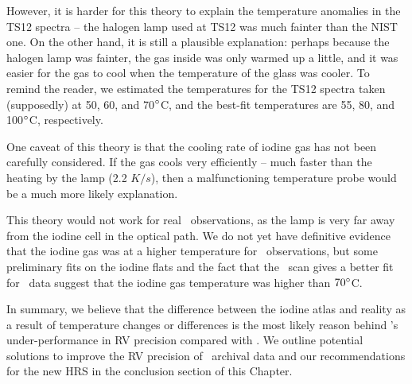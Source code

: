 However, it is harder for this theory to explain the temperature
anomalies in the TS12 spectra -- the halogen lamp used at TS12 was
much fainter than the NIST one. On the other hand, it is still a
plausible explanation: perhaps because the halogen lamp was fainter,
the gas inside was only warmed up a little, and it was easier for the
gas to cool when the temperature of the glass was cooler. To remind
the reader, we estimated the temperatures for the TS12 spectra taken
(supposedly) at 50, 60, and 70$^{\circ}$C, and the best-fit
temperatures are 55, 80, and 100$^{\circ}$C, respectively.

One caveat of this theory is that the cooling rate of iodine gas has
not been carefully considered. If the gas cools very efficiently --
much faster than the heating by the lamp (2.2 $K/s$), then a
malfunctioning temperature probe would be a much more likely
explanation.

This theory would not work for real \het\ observations, as the lamp is
very far away from the iodine cell in the optical path. We do not yet
have definitive evidence that the iodine gas was at a higher
temperature for \het\ observations, but some preliminary fits on the
iodine flats and the fact that the \keck\ scan gives a better fit
for \het\ data suggest that the iodine gas temperature was higher than
$70^{\circ}$C.

In summary, we believe that the difference between the iodine atlas
and reality as a result of temperature changes or differences is the
most likely reason behind \het's under-performance in RV precision
compared with \keck. We outline potential solutions to improve the RV
precision of \het\ archival data and our recommendations for the new
HRS in the conclusion section of this Chapter.
